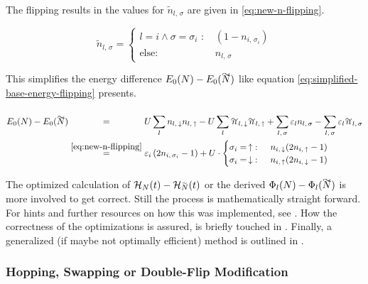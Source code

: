 The flipping results in the values for $\tilde{n}_{l,\,\sigma}$ are given in \autoref{eq:new-n-flipping}.

\begin{equation}
    \label{eq:new-n-flipping}
    \tilde{n}_{l,\,\sigma} = \begin{cases}
        l = i \land \sigma = \sigma_i\text{ : }  &  (1 - n_{i,\,\sigma_i})  \\
        \text{else: }   &    n_{l,\,\sigma} 
    \end{cases}
\end{equation}

This simplifies the energy difference $E_0(N)-E_0(\vphantom{N}\smash{\tilde{N}})$ like equation \autoref{eq:simplified-base-energy-flipping} presents.

\begin{equation}
    \label{eq:simplified-base-energy-flipping}
    \begin{split}
        E_0(N)-E_0(\vphantom{N}\smash{\tilde{N}}) 
        &\stackrel{\phantom{\ref{eq:new-n-flipping}}}{=} U\lsum n_{l,\,\down}n_{l,\,\up}-U\lsum \tilde{n}_{l,\,\down}\tilde{n}_{l,\,\up} 
        + \lsum[l,\,\sigma] \epsl n_{l,\,\sigma} - \lsum[l,\,\sigma] \epsl \tilde{n}_{l,\,\sigma}\\
        &\stackrel{\ref{eq:new-n-flipping}}{=} \epsl[i] \left(2 n_{i,\,\sigma_i} - 1\right) +
        U\cdot \begin{cases}
            \sigma_i = \,\up\text{: }   & n_{i,\,\down} (2 n_{i,\,\up} - 1)\\
            \sigma_i = \,\down\text{: } & n_{i,\,\up} (2 n_{i,\,\down} - 1)  
        \end{cases}
    \end{split}
\end{equation}

The optimized calculation of $\HNOft - \HNOft[\vphantom{N}\smash{\tilde{N}}]$ or the derived $\Phi_l(N) - \Phi_l(\vphantom{N}\smash{\tilde{N}})$ is more involved to get correct.
Still the process is mathematically straight forward. 
For hints and further resources on how this was implemented, see .
How the correctness of the optimizations is assured, is briefly touched in .
Finally, a generalized (if maybe not optimally efficient) method is outlined in .

\subsubsection*{Hopping, Swapping or Double-Flip Modification}

